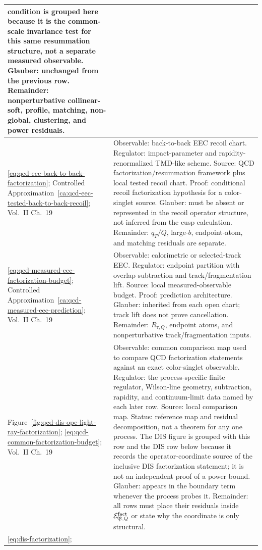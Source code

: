 {\begin{longtable}{@{}>{\raggedright\arraybackslash}p{}>{\raggedright\arraybackslash}p{}@{}}
condition is grouped here because it is the common-scale invariance test for
this same resummation structure, not a separate measured observable.  Glauber:
unchanged from the previous row.  Remainder: nonperturbative collinear-soft,
profile, matching, non-global, clustering, and power residuals.
\\ \hline
\eqref{eq:qcd-eec-back-to-back-factorization};
Controlled Approximation~\ref{ca:qcd-eec-tested-back-to-back-recoil};
Vol.~II Ch.~19 &
Observable: back-to-back EEC recoil chart.  Regulator: impact-parameter and
rapidity-renormalized TMD-like scheme.  Source: QCD
factorization/resummation framework \cite{CollinsSoperSterman1989Factorization}
plus local tested recoil chart.  Proof: conditional recoil factorization
hypothesis for a color-singlet source.  Glauber: must be absent or represented
in the recoil operator structure, not inferred from the cusp calculation.
Remainder:
\(q_T/Q\), large-\(b\), endpoint-atom, and matching residuals are separate.
\\ \hline
\eqref{eq:qcd-measured-eec-factorization-budget};
Controlled Approximation~\ref{ca:qcd-measured-eec-prediction};
Vol.~II Ch.~19 &
Observable: calorimetric or selected-track EEC.  Regulator: endpoint partition
with overlap subtraction and track/fragmentation lift.  Source: local
measured-observable budget.  Proof: prediction architecture.  Glauber:
inherited from each open chart; track lift does not prove cancellation.
Remainder: \(R_{\tau,Q}\), endpoint atoms, and nonperturbative
track/fragmentation inputs.
\\ \hline
Figure~\ref{fig:qcd-dis-ope-light-ray-factorization};
\eqref{eq:qcd-common-factorization-budget};
Vol.~II Ch.~19 &
Observable: common comparison map used to compare QCD factorization
statements against an exact color-singlet observable.  Regulator: the
process-specific finite regulator, Wilson-line geometry, subtraction,
rapidity, and continuum-limit data named by each later row.  Source: local
comparison map.  Status: reference map and residual
decomposition, not a theorem for any one process.  The DIS figure is grouped
with this row and the DIS row below because it records the operator-coordinate
source of the inclusive DIS factorization statement; it is not an independent
proof of a power bound.
Glauber: appears in the boundary term whenever the process probes it.
Remainder: all rows must place their residuals inside
\(\mathcal E_{\mathfrak P,Q}^{\rm fact}\) or state why the coordinate is only
structural.
\\ \hline
\eqref{eq:dis-factorization};

\end{longtable}}
